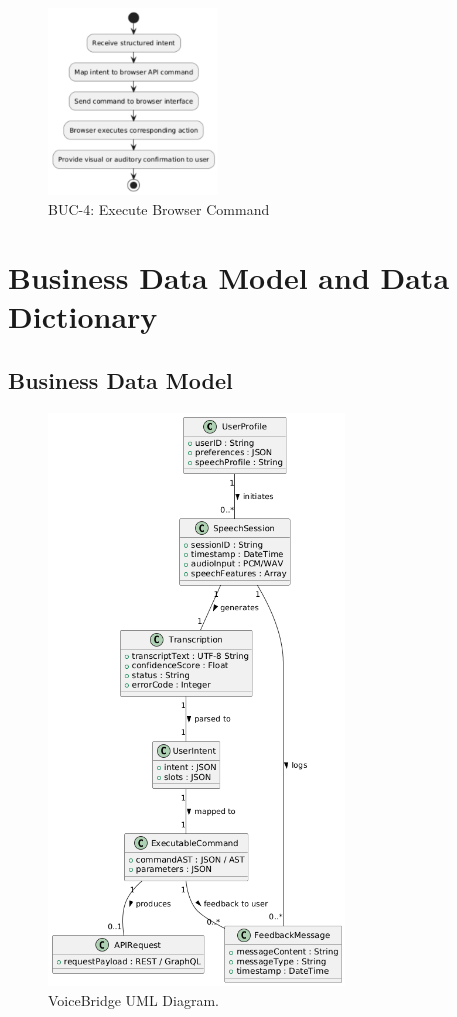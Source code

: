 \documentclass[11pt]{article}
\begin{document}
\begin{figure}[H]
\centering
\includegraphics[width=0.4\textwidth]{../imgs/BUC4.png}
\caption{BUC-4: Execute Browser Command}
\label{fig:buc4}
\end{figure}

\section{Business Data Model and Data Dictionary}
\subsection{Business Data Model}
\begin{figure}[H]
    \centering
    \includegraphics[width=0.7\textwidth]{..//imgs/VoiceBridge_uml.png}
    \caption{VoiceBridge UML Diagram. }
    \label{fig:voicebridge-usecase}
\end{figure} 
\end{document}
